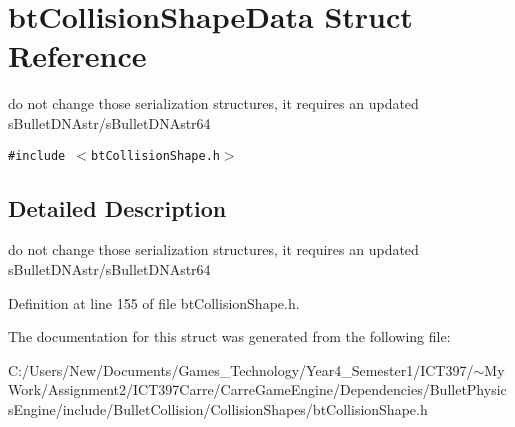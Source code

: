 \hypertarget{structbt_collision_shape_data}{
\section{btCollisionShapeData Struct Reference}
\label{structbt_collision_shape_data}
}
do not change those serialization structures, it requires an updated sBulletDNAstr/sBulletDNAstr64  


{\tt \#include $<$btCollisionShape.h$>$}



\subsection{Detailed Description}
do not change those serialization structures, it requires an updated sBulletDNAstr/sBulletDNAstr64 

Definition at line 155 of file btCollisionShape.h.

The documentation for this struct was generated from the following file:\begin{CompactItemize}
\item 
C:/Users/New/Documents/Games\_\-Technology/Year4\_\-Semester1/ICT397/$\sim$My Work/Assignment2/ICT397Carre/CarreGameEngine/Dependencies/BulletPhysicsEngine/include/BulletCollision/CollisionShapes/btCollisionShape.h\end{CompactItemize}
